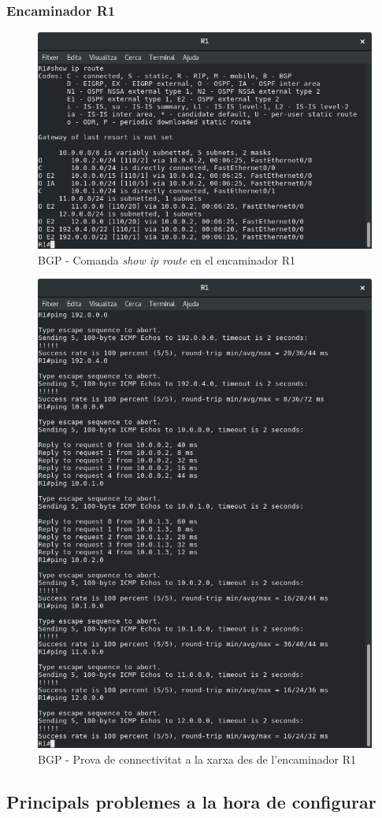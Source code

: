 \documentclass[10pt]{article}
\begin{document}
\subsubsection{Encaminador R1}
\begin{figure}[H]
\begin{center}
\includegraphics[scale=0.4]{Images/bgp-R1-route.png}
\caption{BGP - Comanda \textit{show ip route} en el encaminador R1}
\end{center}
\end{figure}
\begin{figure}[H]
\begin{center}
\includegraphics[scale=0.4]{Images/bgp-R1-conectivity.png}
\caption{BGP - Prova de connectivitat a la xarxa des de l'encaminador R1}
\end{center}
\end{figure}
\subsection{Principals problemes a la hora de configurar}
\end{document}
